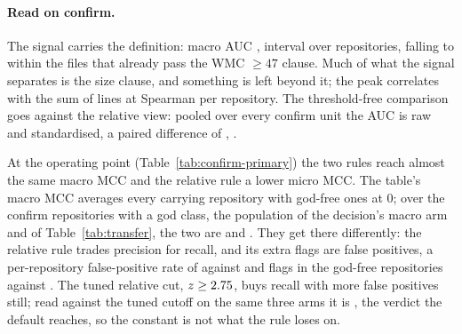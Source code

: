 \documentclass[11pt,a4paper]{article}
\newcommand{\fitwidth}[1]{\resizebox{\ifdim\width>\textwidth\textwidth\else\width\fi}{!}{#1}}
\begin{document}
\paragraph{Read on confirm.} The signal carries the definition: macro AUC
\primAucMacro{}, interval \primAucMacroCI{} over \primAucMacroN{}
repositories, falling to \primAucGiven{} \primAucGivenCI{} within the files
that already pass the WMC $\geq 47$ clause. Much of what the signal separates
is the size clause, and something is left beyond it; the peak correlates with
the sum of lines at Spearman \sizeRhoNlocSum{} per repository. The
threshold-free comparison goes against the relative view: pooled over every
confirm unit the AUC is \primPooledAucRaw{} raw and \primPooledAucStd{}
standardised, a paired difference of \primPooledAucDiff{}
\primPooledAucDiffCI{}, \primPooledAucReading.

\begin{table}[t]
\centering
\caption{The primary read-out on the confirm half: the modified z-score at its
literature default against the absolute cutoff tuned on explore, and the tuned
relative cut as a secondary. Macro is one repository, one vote, over the
\primCarryCo{} confirm repositories carrying the definition, god-free ones at
MCC 0. ``FP in god-free'' is the number of flags in the \primNGodFree{}
confirm repositories where PMD marks nothing.}
\label{tab:confirm-primary}
\small
\setlength{\tabcolsep}{4pt}
\fitwidth{}
\end{table}

At the operating point (Table~\ref{tab:confirm-primary}) the two rules reach
almost the same macro MCC and the relative rule a lower micro MCC. The
table's macro MCC averages every carrying repository with god-free ones at
0; over the \primMacroMccPosN{} confirm repositories with a god class, the
population of the decision's macro arm and of Table~\ref{tab:transfer}, the
two are \primRelMacroMccPos{} and \primAbsMacroMccPos{}. They get there
differently: the relative rule trades precision for recall, and its
extra flags are false positives, a per-repository false-positive rate of
\primRelFprPct{} against \primAbsFprPct{} and \primRelFpGodFree{} flags in
the \primNGodFree{} god-free repositories against \primAbsFpGodFree{}. The
tuned relative cut, $z \geq 2.75$, buys recall with more false positives
still; read against the tuned cutoff on the same three arms it is
\transferMainTunedMinusOwnVerdict{}, the verdict the default reaches, so the
constant is not what the rule loses on.
\end{document}

